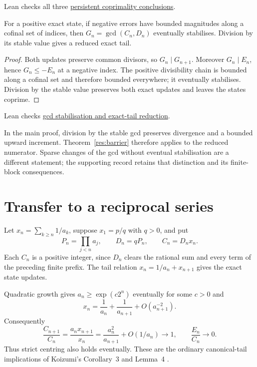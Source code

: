 \documentclass[11pt]{article}
\begin{document}
\noindent Lean checks all three \href{https://github.com/wcook04/plectis-erdos/blob/f36a98bf3d3e6f65f1074e3b800e3293d5b8a51a/ErdosProblems/Erdos243/PaperCompleteR7/Reduction.lean#L16}{persistent coprimality conclusions}.

\begin{proposition}\label{res:gcdstab}
For a positive exact state, if negative errors have bounded magnitudes
along a cofinal set of indices, then $G_n=\gcd(C_n,D_n)$ eventually
stabilises. Division by its stable value gives a reduced exact tail.
\end{proposition}
\begin{proof}
Both updates preserve common divisors, so $G_n\mid G_{n+1}$. Moreover
$G_n\mid E_n$, hence $G_n\le -E_n$ at a negative index. The positive
divisibility chain is bounded along a cofinal set and therefore bounded
everywhere; it eventually stabilises. Division by the stable value
preserves both exact updates and leaves the states coprime.
\end{proof}

\noindent Lean checks \href{https://github.com/wcook04/plectis-erdos/blob/f36a98bf3d3e6f65f1074e3b800e3293d5b8a51a/ErdosProblems/Erdos243/PaperCompleteR7/Reduction.lean#L103}{gcd stabilisation and exact-tail reduction}.

In the main proof, division by the stable gcd preserves divergence and a
bounded upward increment. Theorem~\ref{res:barrier} therefore applies to
the reduced numerator. Sparse changes of the gcd without eventual
stabilisation are a different statement; the supporting record retains
that distinction and its finite-block consequences.

\section{Transfer to a reciprocal series}\label{sec:transfer}
Let $x_n=\sum_{k\ge n}1/a_k$, suppose $x_1=p/q$ with $q>0$, and put
\[
 P_n=\prod_{j<n}a_j,\qquad D_n=qP_n,\qquad C_n=D_nx_n.
\]
Each $C_n$ is a positive integer, since $D_n$ clears the rational sum and
every term of the preceding finite prefix. The tail relation
$x_n=1/a_n+x_{n+1}$ gives the exact state updates.

Quadratic growth gives $a_n\ge\exp(c2^n)$ eventually for some $c>0$ and
\[
 x_n=\frac1{a_n}+\frac1{a_{n+1}}+O(a_{n+1}^{-2}).
\]
Consequently
\[
 \frac{C_{n+1}}{C_n}
 =\frac{a_nx_{n+1}}{x_n}
 =\frac{a_n^2}{a_{n+1}}+O(1/a_n)\longrightarrow1,
 \qquad \frac{E_n}{C_n}\longrightarrow0.
\]
Thus strict centring also holds eventually. These are the ordinary
canonical-tail implications of Koizumi's Corollary~3 and Lemma~4
\cite{koizumi2025}.
\end{document}
